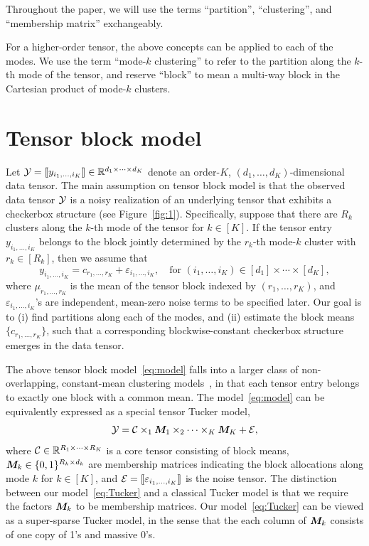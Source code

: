 \documentclass{article}
\begin{document}
Throughout the paper, we will use the terms ``partition'', ``clustering'', and ``membership matrix'' exchangeably. 

For a higher-order tensor, the above concepts can be applied to each of the modes. We use the term ``mode-$k$ clustering'' to refer to the partition along the $k$-th mode of the tensor, and reserve ``block'' to mean a multi-way block in the Cartesian product of mode-$k$ clusters. 

\section{Tensor block model}
Let $\mathcal{Y}=\llbracket y_{i_1,\ldots,i_K} \rrbracket\in\mathbb{R}^{d_1\times \cdots\times d_K}$ denote an order-$K$, $(d_1,\ldots,d_K)$-dimensional data tensor. The main assumption on tensor block model is that the observed data tensor $\mathcal{Y}$ is a noisy realization of an underlying tensor that exhibits a checkerbox structure (see Figure~\ref{fig:1}). Specifically, suppose that there are $R_k$ clusters along the $k$-th mode of the tensor for $k\in[K]$. If the tensor entry $y_{i_1,\ldots,i_K}$ belongs to the block jointly determined by the $r_k$-th mode-$k$ cluster with $r_k\in[R_k]$, then we assume that 
\begin{equation}\label{eq:model}
y_{i_1,\ldots,i_K}=c_{r_1,\ldots,r_K}+\varepsilon_{i_1,\ldots,i_K},\quad \text{for }(i_1,\ldots,i_K)\in[d_1]\times\cdots\times [d_K],
\end{equation}
where $\mu_{r_1,\ldots,r_K}$ is the mean of the tensor block indexed by $(r_1,\ldots,r_K)$, and $\varepsilon_{i_1,\ldots,i_K}$'s are independent, mean-zero noise terms to be specified later. Our goal is to (i) find partitions along each of the modes, and (ii) estimate the block means $\{c_{r_1,\ldots,r_K}\}$, such that a corresponding blockwise-constant checkerbox structure emerges in the data tensor. 

The above tensor block model~\eqref{eq:model} falls into a larger class of non-overlapping, constant-mean clustering models~\cite{madeira2004biclustering}, in that each tensor entry belongs to exactly one block with a common mean. The model~\eqref{eq:model} can be equivalently expressed as a special tensor Tucker model,
\begin{equation}\label{eq:Tucker}
\mathcal{Y}=\mathcal{C}\times_1\bm M_1\times_2\cdots \times_K \bm M_K+\mathcal{E},
\end{equation}
where $\mathcal{C}\in\mathbb{R}^{R_1\times\cdots\times R_K}$ is a core tensor consisting of block means, $\bm M_k \in\{0,1\}^{R_k\times d_k}$ are membership matrices indicating the block allocations along mode $k$ for $k\in[K]$, and $\mathcal{E}=\llbracket \varepsilon_{i_1,\ldots,i_K} \rrbracket$ is the noise tensor. The distinction between our model~\eqref{eq:Tucker} and a classical Tucker model is that we require the factors $\bm M_k$ to be membership matrices. Our model~\eqref{eq:Tucker} can be viewed as a super-sparse Tucker model, in the sense that the each column of $\bm M_k$ consists of one copy of 1's and massive 0's. 
\end{document}
